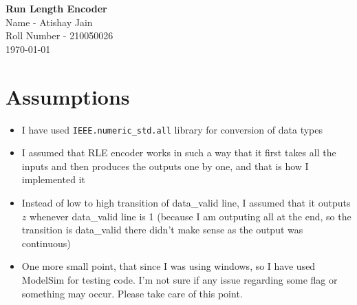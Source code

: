 \documentclass[12pt,a4paper]{article}
\begin{document}
\setlength{\parindent}{0cm}
\begin{center}
\vspace*{2em}
{\textbf {\huge Run Length Encoder}}\\[5mm]
{\large Name - Atishay Jain \\ \vspace{0.5 ex} Roll Number - 210050026} \\[5mm]
\today\\[5mm] %
\end{center}

\section{Assumptions}
\begin{itemize}
    \item I have used \texttt{IEEE.numeric\_std.all} library for conversion of data types
    \item I assumed that RLE encoder works in such a way that it first takes all the inputs and then produces the outputs one by one, and that is how I implemented it
    \item Instead of low to high transition of data\_valid line, I assumed that it outputs $z$ whenever data\_valid line is 1 (because I am outputing all at the end, so the transition is data\_valid there didn't make sense as the output was continuous)
    \item One more small point, that since I was using windows, so I have used ModelSim for testing code. I'm not sure if any issue regarding some flag or something may occur. Please take care of this point.
\end{itemize}
\end{document}

